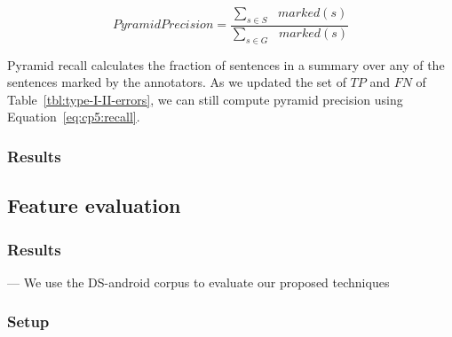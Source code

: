 \begin{equation}
\label{eq:cp5:pyramid-precision}    
    Pyramid Precision =  \frac{\sum_{s \in S} \text{ } marked(s)}{\sum_{s \in G} \text{ } marked(s)}
\end{equation}






\vspace{2mm}
Pyramid recall calculates the fraction of sentences in a summary over 
any of the sentences marked by the annotators. As we updated the set of $TP$ and $FN$ of Table~\ref{tbl:type-I-II-errors}, we can still compute pyramid precision using Equation~\ref{eq:cp5:recall}.





\subsubsection{Results}





\subsection{Feature evaluation}



\subsubsection{Results}



--- We use the \acs{DS-android} corpus to evaluate our proposed techniques  \vspace{3mm}






\subsubsection{Setup}

